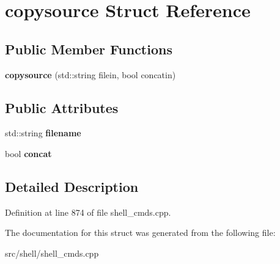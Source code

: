 \hypertarget{structcopysource}{\section{copysource Struct Reference}
\label{structcopysource}
}
\subsection*{Public Member Functions}
\begin{DoxyCompactItemize}
\item 
\hypertarget{structcopysource_a331ce01a5535122b9d07a69019377fef}{{\bfseries copysource} (std\-::string filein, bool concatin)}\label{structcopysource_a331ce01a5535122b9d07a69019377fef}

\end{DoxyCompactItemize}
\subsection*{Public Attributes}
\begin{DoxyCompactItemize}
\item 
\hypertarget{structcopysource_a53465278c86308205dd85bcb4277773d}{std\-::string {\bfseries filename}}\label{structcopysource_a53465278c86308205dd85bcb4277773d}

\item 
\hypertarget{structcopysource_afc69446550cf7febabeeba26122b0e84}{bool {\bfseries concat}}\label{structcopysource_afc69446550cf7febabeeba26122b0e84}

\end{DoxyCompactItemize}


\subsection{Detailed Description}


Definition at line 874 of file shell\-\_\-cmds.\-cpp.



The documentation for this struct was generated from the following file\-:\begin{DoxyCompactItemize}
\item 
src/shell/shell\-\_\-cmds.\-cpp\end{DoxyCompactItemize}

